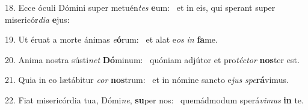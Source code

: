 18. Ecce óculi Dómini super metuén\textit{tes} \textbf{e}um: \ast\  et in eis, qui sperant super misericór\textit{di}\textit{a} \textbf{e}jus:\

19. Ut éruat a morte ánimas \textit{e}\textbf{ó}rum: \ast\  et alat e\textit{os} \textit{in} \textbf{fa}me.\

20. Anima nostra sústi\textit{net} \textbf{Dó}minum: \ast\  quóniam adjútor et pro\textit{téc}\textit{tor} \textbf{nos}ter est.\

21. Quia in eo lætábitur \textit{cor} \textbf{nos}trum: \ast\  et in nómine sancto e\textit{jus} \textit{spe}\textbf{rá}vimus.\

22. Fiat misericórdia tua, Dómi\textit{ne}, \textbf{su}per nos: \ast\  quemádmodum sperá\textit{vi}\textit{mus} \textbf{in} te.\


